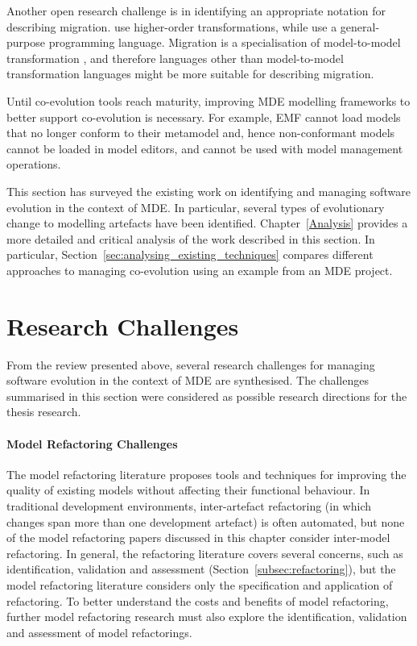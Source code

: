Another open research challenge is in identifying an appropriate notation for describing migration. \cite{wachsmuth07metamodel,cicchetti08automating} use higher-order transformations, while \cite{herrmannsdoerfer09cope} use a general-purpose programming language. Migration is a specialisation of model-to-model transformation \cite{sprinkle04domain}, and therefore languages other than model-to-model transformation languages might be more suitable for describing migration.

Until co-evolution tools reach maturity, improving MDE modelling frameworks to better support co-evolution is necessary. For example, EMF \cite{steinberg09emf} cannot load models that no longer conform to their metamodel and, hence non-conformant models cannot be loaded in model editors, and cannot be used with model management operations.

This section has surveyed the existing work on identifying and managing software evolution in the context of MDE. In particular, several types of evolutionary change to modelling artefacts have been identified. Chapter~\ref{Analysis} provides a more detailed and critical analysis of the work described in this section. In particular, Section~\ref{sec:analysing_existing_techniques} compares different approaches to managing co-evolution using an example from an MDE project.

\section{Research Challenges}
From the review presented above, several research challenges for managing software evolution in the context of MDE are synthesised. The challenges summarised in this section were considered as possible research directions for the thesis research.

\paragraph{Model Refactoring Challenges} The model refactoring literature proposes tools and techniques for improving the quality of existing models without affecting their functional behaviour. In traditional development environments, inter-artefact refactoring (in which changes span more than one development artefact) is often automated, but none of the model refactoring papers discussed in this chapter consider inter-model refactoring. In general, the refactoring literature covers several concerns, such as identification, validation and assessment (Section~\ref{subsec:refactoring}), but the model refactoring literature considers only the specification and application of refactoring. To better understand the costs and benefits of model refactoring, further model refactoring research must also explore the identification, validation and assessment of model refactorings.

